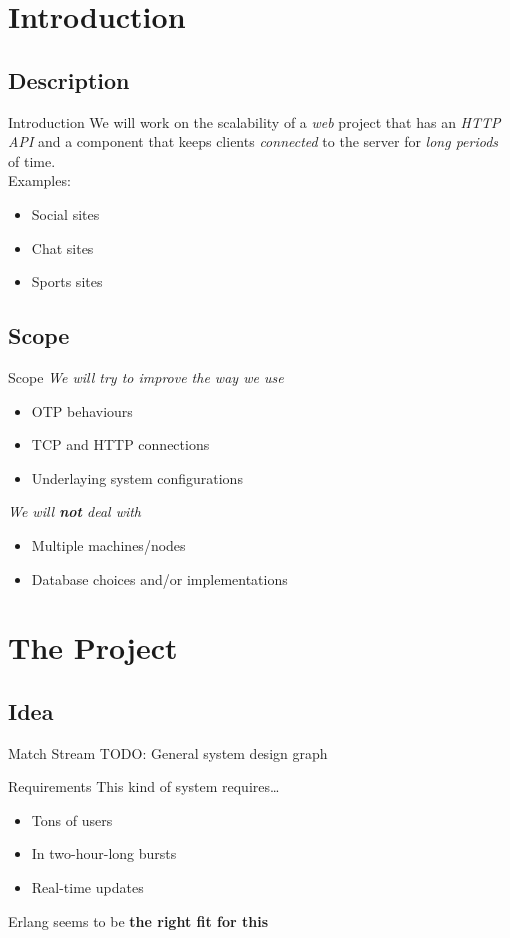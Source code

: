 \documentclass[utf8]{beamer}
\begin{document}

\section{Introduction}
\subsection{Description}
\begin{frame}{Introduction}
	We will work on the scalability of a \emph{web} project \pause that has an \emph{HTTP API} \pause and a component that keeps clients \emph{connected} to the server \pause for \emph{long periods} of time.\\
\pause Examples:
	\begin{itemize}
		\item<+-> Social sites
		\item<+-> Chat sites
		\item<+-> Sports sites
	\end{itemize}
\end{frame}

\subsection{Scope}
\begin{frame}{Scope}
	\emph{We will try to improve the way we use}
	\begin{itemize}
		\item OTP behaviours
		\item TCP and HTTP connections
		\item Underlaying system configurations
	\end{itemize}
	\pause
	\emph{We will \textbf{not} deal with}
	\begin{itemize}
		\item Multiple machines/nodes
		\item Database choices and/or implementations
	\end{itemize}
\end{frame}

\section{The Project}
\subsection{Idea}
\begin{frame}{Match Stream}
	TODO: General system design graph
\end{frame}
\begin{frame}{Requirements}
	This kind of system requires\ldots \pause
	\begin{itemize}
		\item<+-> Tons of users
		\item<+-> In two-hour-long bursts
		\item<+-> Real-time updates
	\end{itemize}
	\onslide<+->Erlang seems to be \textbf{the right fit for this}
\end{frame}
\end{document}
